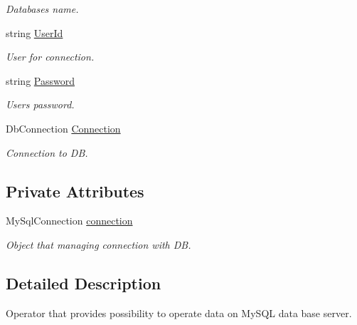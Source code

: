 \begin{DoxyCompactItemize}
\begin{DoxyCompactList}\small\item\em Database\textquotesingle{}s name. \end{DoxyCompactList}\item 
string \mbox{\hyperlink{class_uniform_data_operator_1_1_sql_1_1_my_sql_1_1_my_sql_data_operator_ae5e119508a6d9807b9e138c628a6e18f}{User\+Id}}
\begin{DoxyCompactList}\small\item\em User for connection. \end{DoxyCompactList}\item 
string \mbox{\hyperlink{class_uniform_data_operator_1_1_sql_1_1_my_sql_1_1_my_sql_data_operator_aa080c79169d2bf29ac2249436ef2471c}{Password}}
\begin{DoxyCompactList}\small\item\em User\textquotesingle{}s password. \end{DoxyCompactList}\item 
Db\+Connection \mbox{\hyperlink{class_uniform_data_operator_1_1_sql_1_1_my_sql_1_1_my_sql_data_operator_a5c5d34c3f7b7d95773ba44ede46409a0}{Connection}}
\begin{DoxyCompactList}\small\item\em Connection to DB. \end{DoxyCompactList}\end{DoxyCompactItemize}
\subsection*{Private Attributes}
\begin{DoxyCompactItemize}
\item 
My\+Sql\+Connection \mbox{\hyperlink{class_uniform_data_operator_1_1_sql_1_1_my_sql_1_1_my_sql_data_operator_a807f034631cd8284ecc020d765e6f6f1}{connection}}
\begin{DoxyCompactList}\small\item\em Object that managing connection with DB. \end{DoxyCompactList}\end{DoxyCompactItemize}


\subsection{Detailed Description}
Operator that provides possibility to operate data on My\+S\+QL data base server. 



